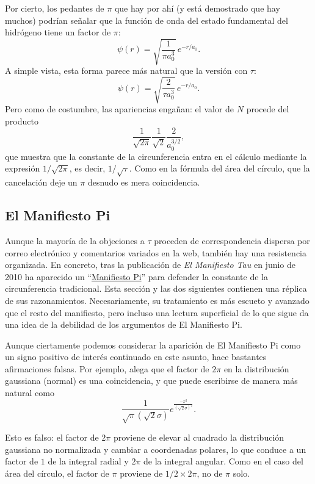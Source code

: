 Por cierto, los pedantes de $\pi$ que hay por ahí (y está demostrado que hay muchos) podrían señalar que la función de onda del estado fundamental del hidrógeno tiene un factor de $\pi$:
\[
\psi(r) = \sqrt{\frac{1}{\pi a_0^3}}\,e^{-r/a_0}.
\]
A simple vista, esta forma parece más natural que la versión con $\tau$:
\[
\psi(r) = \sqrt{\frac{2}{\tau a_0^3}}\,e^{-r/a_0}.
\]
Pero como de costumbre, las apariencias engañan: el valor de $N$ procede del producto
\[
\frac{1}{\sqrt{2\pi}} \frac{1}{\sqrt{2}} \frac{2}{a_0^{3/2}},
\]
que muestra que la constante de la circunferencia entra en el cálculo mediante la expresión $1/\sqrt{2\pi}$, es decir, $1/\sqrt{\tau}$. Como en la fórmula del área del círculo, que la cancelación deje un $\pi$ desnudo es mera coincidencia.



  \subsection{El Manifiesto Pi} %
  \label{sec:the_pi_manifesto_a_rebuttal}

Aunque la mayoría de la objeciones a $\tau$ proceden de correspondencia dispersa por correo electrónico y comentarios variados en la web, también hay una resistencia organizada. En concreto, tras la publicación de \emph{El Manifiesto Tau} en junio de 2010 ha aparecido un ``\href{http://www.thepimanifesto.com/}{Manifiesto Pi}'' para defender la constante de la circunferencia tradicional. Esta sección y las dos siguientes contienen una réplica de sus razonamientos. Necesariamente, su tratamiento es más escueto y avanzado que el resto del manifiesto, pero incluso una lectura superficial de lo que sigue da una idea de la debilidad de los argumentos de El Manifiesto Pi.

Aunque ciertamente podemos considerar la aparición de El Manifiesto Pi como un signo positivo de interés continuado en este asunto, hace bastantes afirmaciones falsas. Por ejemplo, alega que el factor de $2\pi$ en la distribución gaussiana (normal) es una coincidencia, y que puede escribirse de manera más natural como
\[
\frac{1}{\sqrt\pi(\sqrt 2\sigma)}e^{\frac{-x^2}{(\sqrt 2\sigma)^2}}.
\]

Esto es falso: el factor de $2\pi$ proviene de elevar al cuadrado la distribución gaussiana no normalizada y cambiar a coordenadas polares, lo que conduce a un factor de $1$ de la integral radial y  $2\pi$ de la integral angular. Como en el caso del área del círculo, el factor de $\pi$ proviene de $1/2\times 2\pi$, no de $\pi$ solo.

